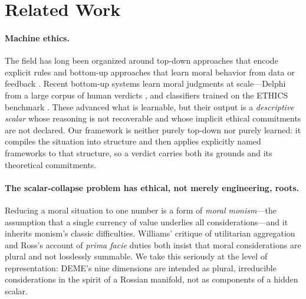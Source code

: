\section{Related Work}
\label{sec:related}

\paragraph{Machine ethics.}
The field has long been organized around top-down approaches that encode explicit rules
and bottom-up approaches that learn moral behavior from data or feedback
\citep{wallach2009moral,anderson2011machine}. Recent bottom-up systems learn moral
judgments at scale---Delphi from a large corpus of human verdicts \citep{jiang2021delphi},
and classifiers trained on the ETHICS benchmark \citep{hendrycks2021ethics}. These advanced
what is learnable, but their output is a \emph{descriptive scalar} whose reasoning is not
recoverable and whose implicit ethical commitments are not declared. Our framework is
neither purely top-down nor purely learned: it compiles the situation into structure and
then applies explicitly named frameworks to that structure, so a verdict carries both its
grounds and its theoretical commitments.

\paragraph{The scalar-collapse problem has ethical, not merely engineering, roots.}
Reducing a moral situation to one number is a form of \emph{moral monism}---the assumption
that a single currency of value underlies all considerations---and it inherits monism's
classic difficulties. Williams' critique of utilitarian aggregation \citep{williams1973}
and Ross's account of \emph{prima facie} duties \citep{ross1930} both insist that moral
considerations are plural and not losslessly summable. We take this seriously at the level
of representation: DEME's nine dimensions are intended as plural, irreducible considerations
in the spirit of a Rossian manifold, not as components of a hidden scalar.

